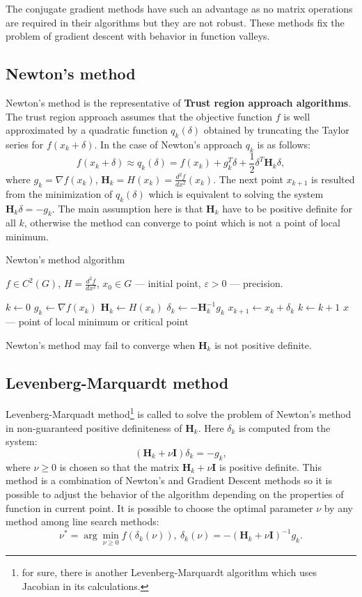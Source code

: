 \documentclass[12pt, bachelor, substylefile = algo_title.rtx]{disser}
\newcommand{\eps}{\varepsilon}
\theoremstyle{definition}
\begin{document}
The conjugate gradient methods have such an advantage as no matrix operations are required in their algorithms but they are not robust. These methods fix the problem of gradient descent with behavior in function valleys.

\subsection{Newton's method}
Newton's method is the representative of \textbf{Trust region approach algorithms}. The trust region approach assumes that the objective function $f$ is well approximated by a quadratic function $q_k (\delta)$ obtained by truncating the Taylor series for $f(x_k + \delta)$. In the case of Newton's approach $q_k$ is as follows:
\[ f(x_k + \delta) \approx q_k(\delta) = f(x_k) + g_k^T \delta + \frac{1}{2} \delta^T \mathbf{H}_k \delta, \]
where $g_k = \nabla f(x_k)$, $\mathbf{H}_k = H(x_k) = \frac{d^2 f}{dx^2}(x_k)$. The next point $x_{k+1}$ is resulted from the minimization of $q_k(\delta)$ which is equivalent to solving the system $\mathbf{H}_k \delta = -g_k$. The main assumption here is that $\mathbf{H}_k$ have to be positive definite for all $k$, otherwise the method can converge to point which is not a point of local minimum. 

\begin{algorithm}[h]
\caption{Newton's method algorithm}
\label{alg: newton}
\begin{algorithmic}

\Require $f \in C^2(G)$, $H = \frac{d^2 f}{dx^2}$, $x_0 \in G$ --- initial point, $\eps>0$ --- precision. 

\State $k \gets 0$
\While{$\|x_k - x_{k-1}\| > \eps$}
\State $g_k \gets \nabla f(x_k)$
\State $\mathbf{H}_k \gets H(x_k)$
\State $\delta_k \gets -\mathbf{H}^{-1}_k g_k$
\State $x_{k+1} \gets x_{k} + \delta_{k}$
\State $k \gets k+1$
\EndWhile
\Ensure $\widehat{x}$ --- point of local minimum or critical point
\end{algorithmic}
\end{algorithm}

Newton’s method may fail to converge when $\mathbf{H}_k$ is not positive definite.

\subsection{Levenberg-Marquardt method}
Levenberg-Marquadt method\footnote{for sure, there is another Levenberg-Marquardt algorithm which uses Jacobian in its calculations.} is called to solve the problem of Newton's method in non-guaranteed positive definiteness of $\mathbf{H}_k$. Here $\delta_k$ is computed from the system:
\[ (\mathbf{H}_k + \nu \mathbf{I})\delta_k = -g_k, \]
where $\nu \ge 0$ is chosen so that the matrix $\mathbf{H}_k + \nu \mathbf{I}$ is positive definite. This method is a combination of Newton's and Gradient Descent methods so it is possible to adjust the behavior of the algorithm depending on the properties of function in current point. It is possible to choose the optimal parameter $\nu$ by any method among line search methods:
\[ \nu^* = \arg \min_{\nu \ge 0} f(\delta_k(\nu)),\  \delta_k(\nu) = -  (\mathbf{H}_k + \nu \mathbf{I})^{-1}g_k.\]
\end{document}
